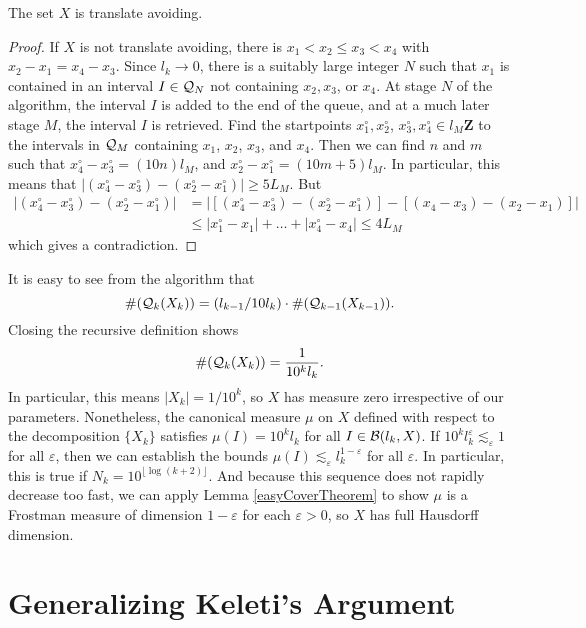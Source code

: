 \begin{lemma}
    The set $X$ is translate avoiding.
\end{lemma}
\begin{proof}
    If $X$ is not translate avoiding, there is $x_1 < x_2 \leq x_3 < x_4$ with $x_2 - x_1 = x_4 - x_3$. Since $l_k \to 0$, there is a suitably large integer $N$ such that $x_1$ is contained in an interval $I \in \operatorname{\mathcal{Q}}_N$ not containing $x_2,x_3$, or $x_4$. At stage $N$ of the algorithm, the interval $I$ is added to the end of the queue, and at a much later stage $M$, the interval $I$ is retrieved. Find the startpoints $x_1^\circ, x_2^\circ$, $x_3^\circ, x_4^\circ \in l_M \mathbf{Z}$ to the intervals in $\operatorname{\mathcal{Q}}_M$ containing $x_1$, $x_2$, $x_3$, and $x_4$. Then we can find $n$ and $m$ such that $x_4^\circ - x_3^\circ = (10n)l_M$, and $x_2^\circ - x_1^\circ = (10m + 5)l_M$. In particular, this means that $|(x_4^\circ - x_3^\circ) - (x_2^\circ - x_1^\circ)| \geq 5L_M$. But
    \begin{align*}
        |(x_4^\circ - x_3^\circ) - (x_2^\circ - x_1^\circ)| &= |[(x_4^\circ - x_3^\circ) - (x_2^\circ - x_1^\circ)] - [(x_4 - x_3) - (x_2 - x_1)]|\\
        &\leq |x_1^\circ - x_1| + \dots + |x_4^\circ - x_4| \leq 4 L_M
    \end{align*}
    which gives a contradiction.
\end{proof}

It is easy to see from the algorithm that
%
\[ \# (\operatorname{\mathcal{Q}}_k(X_k)) = (l_{k-1}/10l_k) \cdot \#(\operatorname{\mathcal{Q}}_{k-1}(X_{k-1})). \]
%
Closing the recursive definition shows
%
\[ \#(\operatorname{\mathcal{Q}}_k(X_k)) = \frac{1}{10^k l_k}. \]
%
In particular, this means $|X_k| = 1/10^k$, so $X$ has measure zero irrespective of our parameters. Nonetheless, the canonical measure $\mu$ on $X$ defined with respect to the decomposition $\{ X_k \}$ satisfies $\mu(I) = 10^k l_k$ for all $I \in \operatorname{\mathcal{B}}(l_k,X)$. If $10^k l_k^\varepsilon \lesssim_\varepsilon 1$ for all $\varepsilon$, then we can establish the bounds $\mu(I) \lesssim_\varepsilon l_k^{1-\varepsilon}$ for all $\varepsilon$. In particular, this is true if $N_k = 10^{\lfloor \log(k + 2) \rfloor}$. And because this sequence does not rapidly decrease too fast, we can apply Lemma \ref{easyCoverTheorem} to show $\mu$ is a Frostman measure of dimension $1-\varepsilon$ for each $\varepsilon > 0$, so $X$ has full Hausdorff dimension.



\section{Generalizing Keleti's Argument}

